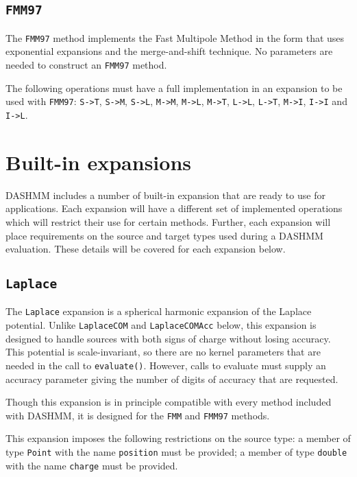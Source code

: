 \subsection{{\tt FMM97}}

The {\tt FMM97} method implements the Fast Multipole Method in the form that
uses exponential expansions and the merge-and-shift technique. No parameters
are needed to construct an {\tt FMM97} method.

The following operations must have a full implementation in an expansion to be
used with {\tt FMM97}: {\tt S->T}, {\tt S->M}, {\tt S->L}, {\tt M->M},
{\tt M->L}, {\tt M->T}, {\tt L->L},
{\tt L->T}, {\tt M->I}, {\tt I->I} and {\tt I->L}.

\section{Built-in expansions}
\label{sec:bi-exp}

DASHMM includes a number of built-in expansion that are ready to use for
applications. Each expansion will have a different set of implemented
operations which will restrict their use for certain methods. Further, each
expansion will place requirements on the source and target types used during
a DASHMM evaluation. These details will be covered for each expansion
below.

\subsection{{\tt Laplace}}

The {\tt Laplace} expansion is a spherical harmonic expansion of the Laplace
potential. Unlike {\tt LaplaceCOM} and {\tt LaplaceCOMAcc} below,
this expansion is
designed to handle sources with both signs of charge without losing accuracy.
This potential is scale-invariant, so there are no kernel parameters that are
needed in the call to {\tt evaluate()}. However, calls to evaluate must supply
an accuracy parameter giving the number of digits of accuracy that are
requested.

Though this expansion is in principle compatible with every method included
with DASHMM, it is designed for the {\tt FMM} and {\tt FMM97} methods.

This expansion imposes the following restrictions on the source type: a
member of type {\tt Point} with the name {\tt position} must be provided; a
member of
type {\tt double} with the name {\tt charge} must be provided.

